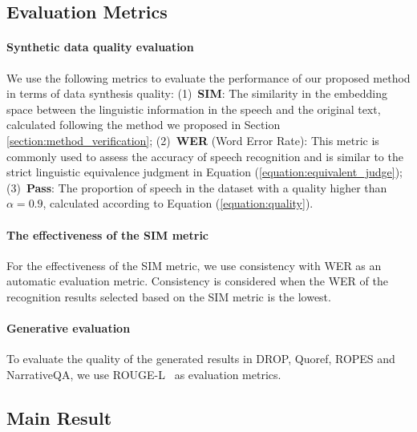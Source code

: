 \documentclass[11pt]{article}
\begin{document}
	\subsection{Evaluation Metrics}
	
	\paragraph{Synthetic data quality evaluation}
	We use the following metrics to evaluate the performance of our proposed method in terms of data synthesis quality:  
	(1)~\textbf{SIM}: The similarity in the embedding space between the linguistic information in the speech and the original text, calculated following the method we proposed in Section \ref{section:method_verification}; (2)~\textbf{WER} (Word Error Rate): This metric is commonly used to assess the accuracy of speech recognition and is similar to the strict linguistic equivalence judgment in Equation (\ref{equation:equivalent_judge}); (3)~\textbf{Pass}: The proportion of speech in the dataset with a quality higher than $\alpha=0.9$, calculated according to Equation (\ref{equation:quality}).

	\paragraph{The effectiveness of the SIM metric}

	For the effectiveness of the SIM metric, we use consistency with WER as an automatic evaluation metric. Consistency is considered when the WER of the recognition results selected based on the SIM metric is the lowest.

	\paragraph{Generative evaluation}
	To evaluate the quality of the generated results in DROP, Quoref, ROPES and NarrativeQA, we use ROUGE-L~\citep{lin-2004-rouge} as evaluation metrics.



	\subsection{Main Result}
\end{document}
